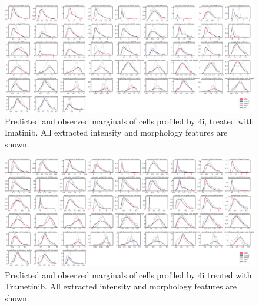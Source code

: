 \begin{figure}[H]
    \centering
    \includegraphics[width=\textwidth]{figures/cellot-methods/Bunne_Supp_Fig1.png}
    \caption{Predicted and observed marginals of cells profiled by 4i, treated with Imatinib. All extracted intensity and morphology features are shown.}
    \label{supp_fig:4i_all_marginals_imatinib}
\end{figure}

\begin{figure}[H]
    \centering
    \includegraphics[width=\textwidth]{figures/cellot-methods/Bunne_Supp_Fig2.png}
    \caption{Predicted and observed marginals of cells profiled by 4i treated with Trametinib. All extracted intensity and morphology features are shown.}
    \label{supp_fig:4i_all_marginals_trametinib}
 \end{figure}
 
